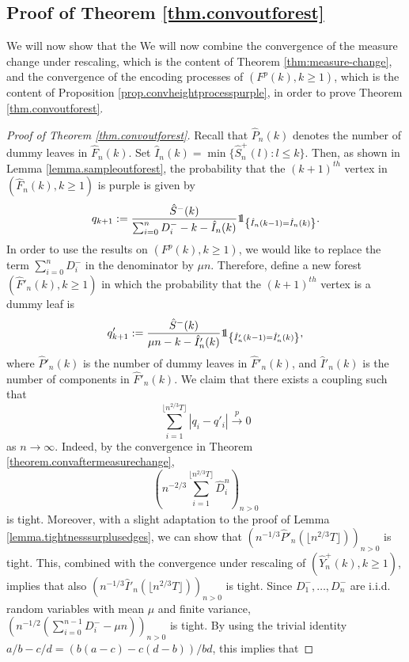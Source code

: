 \subsection{Proof of Theorem \ref{thm.convoutforest}}\label{subsubsec.convaftermeasurechange}
We will now show that the 
We will now combine the convergence of the measure change under rescaling, which is the content of Theorem \ref{thm:measure-change}, and the convergence of the encoding processes of $(F^p(k),k\geq 1)$, which is the content of Proposition \ref{prop.convheightprocesspurple}, in order to prove Theorem \ref{thm.convoutforest}.

\begin{proof}[Proof of Theorem \ref{thm.convoutforest}]
Recall that $\hat{P}_n(k)$ denotes the number of dummy leaves in $\hat{F}_n(k)$. Set $\hat{I}_n(k)=\min\{\hat{S}^{+}_n(l):l\leq k\}$. Then, as shown in Lemma \ref{lemma.sampleoutforest}, the probability that the $(k+1)^{th}$ vertex in $(\hat{F}_n(k),k\geq 1)$ is purple is given by
$$q_{k+1}:=\frac{\hat{S}^-(k)}{\sum_{i=0}^n D^-_i-k-\hat{I}_n(k)}\one_{\left\{\hat{I}_n(k-1)= \hat{I}_n(k)\right\}}.$$
In order to use the results on $(F^p(k),k\geq 1)$, we would like to replace the term $\sum_{i=0}^n D^-_i$ in the denominator by $\mu n$. Therefore, define a new forest $(\hat{F}'_n(k), k\geq 1)$ in which the probability that the $(k+1)^{th}$ vertex is a dummy leaf is
$${q}'_{k+1}:=\frac{\hat{S}^-(k)}{\mu n-k-\hat{I}'_n(k)}\one_{\left\{\hat{I}'_n(k-1)=\hat{I}'_n(k)\right\}},$$
where $\hat{P}'_n(k)$ is the number of dummy leaves in $\hat{F}'_n(k)$, and $\hat{I}'_n(k)$ is the number of components in $\hat{F}'_n(k)$. 
We claim that there exists a coupling such that
$$\sum_{i=1}^{\lfloor n^{2/3}T\rfloor }|q_i-q'_i|\overset{p}{\to}0$$
as $n\to \infty$. 
Indeed, by the convergence in Theorem \ref{theorem.convaftermeasurechange}, 
$$\left(n^{-2/3}\sum_{i=1}^{\lfloor n^{2/3}T\rfloor} \hat{D}^n_i\right)_{n>0}$$ is tight. Moreover, with a slight adaptation to the proof of Lemma \ref{lemma.tightnesssurplusedges}, we can show that $\left(n^{-1/3}\hat{P}'_n\left(\lfloor n^{2/3}T\rfloor \right)\right)_{n>0}$ is tight. This, combined with the convergence under rescaling of $(\hat{Y}^+_n(k),k\geq 1)$, implies that also $\left(n^{-1/3}\hat{I}'_n\left(\lfloor n^{2/3}T\rfloor \right)\right)_{n>0}$ is tight.  Since $D^-_1,\dots,D^-_n$ are i.i.d. random variables with mean $\mu$ and finite variance,
$\left(n^{-1/2}\left(\sum_{i=0}^{n-1}D^-_i-\mu n\right)\right)_{n>0}$ is tight. By using the trivial identity $a/b-c/d=(b(a-c)-c(d-b))/bd$, this implies that

\end{proof}
